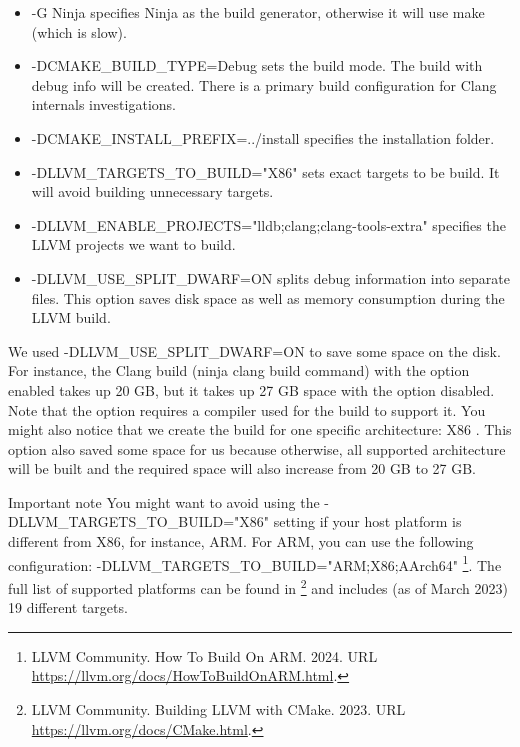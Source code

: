 \begin{itemize}
\item
-G Ninja specifies Ninja as the build generator, otherwise it will use make (which is slow).

\item
-DCMAKE\_BUILD\_TYPE=Debug sets the build mode. The build with debug info will be created. There is a primary build configuration for Clang internals investigations.

\item
-DCMAKE\_INSTALL\_PREFIX=../install specifies the installation folder.

\item
-DLLVM\_TARGETS\_TO\_BUILD="X86" sets exact targets to be build. It will avoid building unnecessary targets.

\item
-DLLVM\_ENABLE\_PROJECTS="lldb;clang;clang-tools-extra" specifies the LLVM projects we want to build.

\item
-DLLVM\_USE\_SPLIT\_DWARF=ON splits debug information into separate files. This option saves disk space as well as memory consumption during the LLVM build.
\end{itemize}

We used -DLLVM\_USE\_SPLIT\_DWARF=ON to save some space on the disk. For instance, the Clang build (ninja clang build command) with the option enabled takes up 20 GB, but it takes up 27 GB space with the option disabled. Note that the option requires a compiler used for the build to support it. You might also notice that we create the build for one specific architecture: X86 . This option also saved some space for us because otherwise, all supported architecture will be built and the required space will also increase from 20 GB to 27 GB.

\begin{myNotic}{Important note}
You might want to avoid using the -DLLVM\_TARGETS\_TO\_BUILD="X86" setting if your host platform is different from X86, for instance, ARM. For ARM, you can use the following configuration: -DLLVM\_TARGETS\_TO\_BUILD="ARM;X86;AArch64" \footnote{LLVM Community. How To Build On ARM. 2024. URL \url{https://llvm.org/docs/HowToBuildOnARM.html}.}. The full list of supported platforms can be found in \footnote{LLVM Community. Building LLVM with CMake. 2023. URL \url{https://llvm.org/docs/CMake.html}.} and includes (as of March 2023) 19 different targets.
\end{myNotic}



